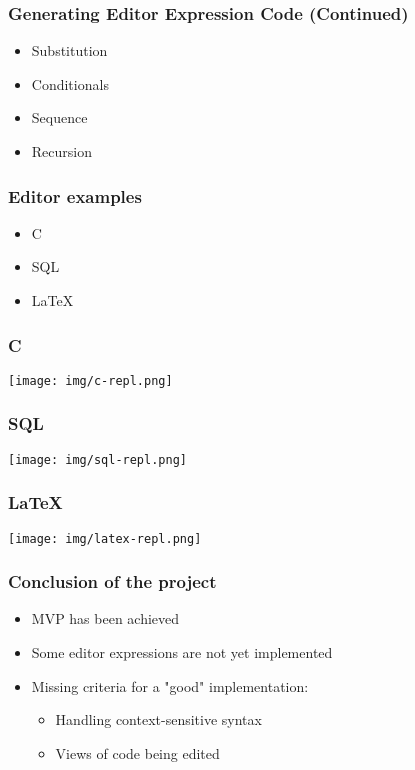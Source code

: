 \documentclass[t,24pt,aspectratio=169]{beamer}
\begin{document}
\begin{frame}[hvid]
    \frametitle{Generating Editor Expression Code (Continued)}
    \begin{itemize}
        \item Substitution
        \item Conditionals
        \item Sequence
        \item Recursion
    \end{itemize}
\end{frame}


\begin{frame}[hvid]
    \frametitle{Editor examples}
    \begin{itemize}
        \item C
        \item SQL
        \item \LaTeX
    \end{itemize}
\end{frame}


\begin{frame}[hvid]
    \frametitle{C}
    \texttt{[image: img/c-repl.png]}
\end{frame}

\begin{frame}[hvid]
    \frametitle{SQL}
    \texttt{[image: img/sql-repl.png]}
\end{frame}

\begin{frame}[hvid]
    \frametitle{\LaTeX}
    \texttt{[image: img/latex-repl.png]}
\end{frame}


\begin{frame}[hvid]
    \frametitle{Conclusion of the project}
    \begin{itemize}
        \item<1-> MVP has been achieved
        \item<2-> Some editor expressions are not yet implemented
        \item<3-> Missing criteria for a "good" implementation:
              \begin{itemize}
                  \item Handling context-sensitive syntax
                  \item Views of code being edited
              \end{itemize}
    \end{itemize}
\end{frame}
\end{document}
